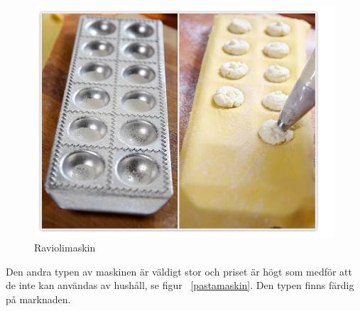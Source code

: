 	\begin{figure}[h]
		\begin{center}
			\includegraphics[scale=0.5]{images/raviolimoldwithfilling.jpg}
			\caption{Raviolimaskin}
			\label{ravioli}	
		\end{center}
	\end{figure}
Den andra typen av maskinen är väldigt stor och priset är högt som medför att de inte kan användas av hushåll, se figur ~\ref{pastamaskin}. Den typen finns färdig på marknaden.

